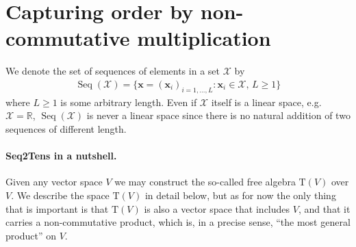 \documentclass{article} \usepackage{iclr2021_conference,times}
\newcommand{\R}{\mathbb{R}}
\newcommand{\bx}{\mathbf{x}}
\newcommand{\cX}{\mathcal{X}}
\newcommand{\T}[1]{\mathrm{T}({#1})}
\newcommand{\Seq}[1]{\operatorname{Seq}(#1)}
\theoremstyle{plain}
\theoremstyle{definition}
\begin{document}
\section{Capturing order by non-commutative multiplication} \label{sec:2}
We denote the set of sequences of elements in a set $\cX$ by 
\begin{align}
  \Seq{\cX}=\{\bx=(\bx_i)_{i=1,\ldots,L}: \bx_i \in \cX,\, L \ge 1\} \end{align}
where $ L\geq 1 $ is some arbitrary length.
Even if $\cX$ itself is a linear space, e.g.~$\cX=\R$, $\Seq{\cX}$ is never a linear space since there is no natural addition of two sequences of different length.
\paragraph{Seq2Tens in a nutshell.}
Given any vector space $ V $ we may construct the so-called free algebra $ \T{V} $ over $ V $.
We describe the space $\T{V}$ in detail below, but as for now the only thing that is important is that $\T{V}$ is also a vector space that includes $V$, and that it carries a non-commutative product, which is, in a precise sense, ``the most general product'' on $ V $.
\end{document}
